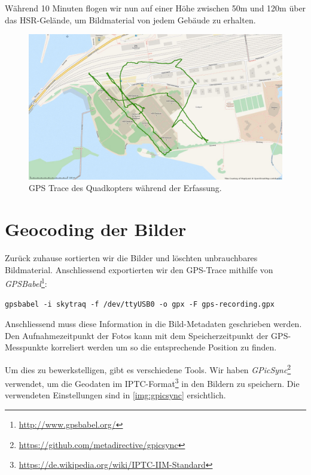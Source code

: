 \noindent Während 10 Minuten flogen wir nun auf einer Höhe zwischen 50m und 120m
über das HSR-Gelände, um Bildmaterial von jedem Gebäude zu erhalten.
\begin{figure}[H]
	\centering
	\includegraphics[width=\textwidth]{images/gpstrace_hsr_mapquest}
	\caption{GPS Trace des Quadkopters während der Erfassung.}
	\label{img:gpstrace_hsr_mapquest}
\end{figure}


\section{Geocoding der Bilder}

\label{workflow:hsr:geocoding}

Zurück zuhause sortierten wir die Bilder und löschten unbrauchbares
Bildmaterial. Anschliessend exportierten wir den GPS-Trace mithilfe von
\textit{GPSBabel}\footnote{\url{http://www.gpsbabel.org/}}:

\vspace{0.5\baselineskip}
\begin{verbatim} 
gpsbabel -i skytraq -f /dev/ttyUSB0 -o gpx -F gps-recording.gpx
\end{verbatim}

Anschliessend muss diese Information in die Bild-Metadaten geschrieben werden.
Den Aufnahmezeitpunkt der Fotos kann mit dem Speicherzeitpunkt der
GPS-Messpunkte korreliert werden um so die entsprechende Position zu finden.

Um dies zu bewerkstelligen, gibt es verschiedene Tools. Wir haben
\textit{GPicSync}\footnote{\url{https://github.com/metadirective/gpicsync}} verwendet,
um die Geodaten im
IPTC-Format\footnote{\url{https://de.wikipedia.org/wiki/IPTC-IIM-Standard}} in
den Bildern zu speichern. Die verwendeten Einstellungen sind in
\autoref{img:gpicsync} ersichtlich.

